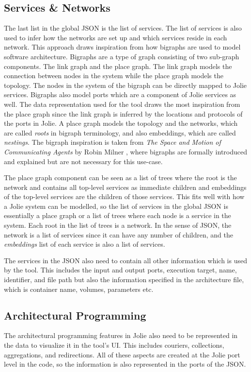 \subsection{Services \& Networks}
The last list in the global JSON is the list of services. The list of services is also used to infer how the networks are set up and which services reside in each network.
This approach draws inspiration from how bigraphs are used to model software architecture. Bigraphs are a type of graph consisting of two sub-graph components. The link graph and the place graph. The link graph models the connection between nodes in the system while the place graph models the topology.
The nodes in the system of the bigraph can be directly mapped to Jolie services. Bigraphs also model ports which are a component of Jolie services as well.
The data representation used for the tool draws the most inspiration from the place graph since the link graph is inferred by the locations and protocols of the ports in Jolie.
A place graph models the topology and the networks, which are called \textit{roots} in bigraph terminology, and also embeddings, which are called \textit{nestings}.
The bigraph inspiration is taken from \textit{The Space and Motion of Communicating Agents} by Robin Milner \cite{BigraphBook}, where bigraphs are formally introduced and explained but are not necessary for this use-case.

The place graph component can be seen as a list of trees where the root is the network and contains all top-level services as immediate children and embeddings of the top-level services are the children of those services.
This fits well with how a Jolie system can be modelled, so the list of services in the global JSON is essentially a place graph or a list of trees where each node is a service in the system.
Each root in the list of trees is a network. In the sense of JSON, the network is a list of services since it can have any number of children, and the \textit{embeddings} list of each service is also a list of services.

The services in the JSON also need to contain all other information which is used by the tool.
This includes the input and output ports, execution target, name, identifier, and file path but also the information specified in the architecture file, which is container name, volumes, parameters etc.

\clearpage
\subsection{Architectural Programming}
The architectural programming features in Jolie also need to be represented in the data to visualize it in the tool's UI.
This includes couriers, collections, aggregations, and redirections. All of these aspects are created at the Jolie port level in the code, so the information is also represented in the ports of the JSON.

